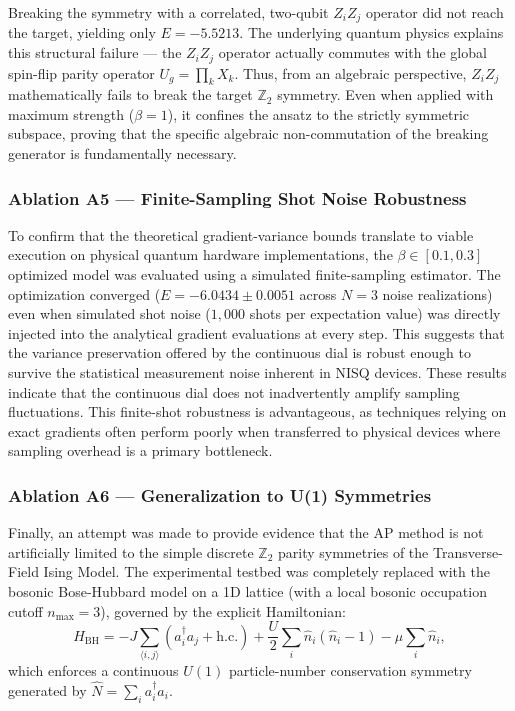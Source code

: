 \documentclass[10pt,twocolumn]{article}
\theoremstyle{remark}
\begin{document}
Breaking the symmetry with a correlated, two-qubit $Z_iZ_j$ operator did not reach the target, yielding only $E = -5.5213$. The underlying quantum physics explains this structural failure --- the $Z_iZ_j$ operator actually commutes with the global spin-flip parity operator $U_g = \prod_k X_k$. Thus, from an algebraic perspective, $Z_iZ_j$ mathematically fails to break the target $\mathbb{Z}_2$ symmetry. Even when applied with maximum strength ($\beta=1$), it confines the ansatz to the strictly symmetric subspace, proving that the specific algebraic non-commutation of the breaking generator is fundamentally necessary.

\subsubsection{Ablation A5 --- Finite-Sampling Shot Noise Robustness}
To confirm that the theoretical gradient-variance bounds translate to viable execution on physical quantum hardware implementations, the $\beta \in [0.1, 0.3]$ optimized model was evaluated using a simulated finite-sampling estimator. The optimization converged ($E = -6.0434 \pm 0.0051$ across $N=3$ noise realizations) even when simulated shot noise ($1,000$ shots per expectation value) was directly injected into the analytical gradient evaluations at every step. This suggests that the variance preservation offered by the continuous dial is robust enough to survive the statistical measurement noise inherent in NISQ devices. These results indicate that the continuous dial does not inadvertently amplify sampling fluctuations. This finite-shot robustness is advantageous, as techniques relying on exact gradients often perform poorly when transferred to physical devices where sampling overhead is a primary bottleneck.

\subsubsection{Ablation A6 --- Generalization to U(1) Symmetries}
Finally, an attempt was made to provide evidence that the AP method is not artificially limited to the simple discrete $\mathbb{Z}_2$ parity symmetries of the Transverse-Field Ising Model. The experimental testbed was completely replaced with the bosonic Bose-Hubbard model on a 1D lattice (with a local bosonic occupation cutoff $n_{\max} = 3$), governed by the explicit Hamiltonian:
\begin{equation}
H_{\text{BH}} = -J \sum_{\langle i, j \rangle} (a_i^\dagger a_j + \mathrm{h.c.}) + \frac{U}{2} \sum_i \hat{n}_i (\hat{n}_i - 1) - \mu \sum_i \hat{n}_i,
\end{equation}
which enforces a continuous $U(1)$ particle-number conservation symmetry generated by $\hat{N} = \sum_i a_i^\dagger a_i$. 
\end{document}
